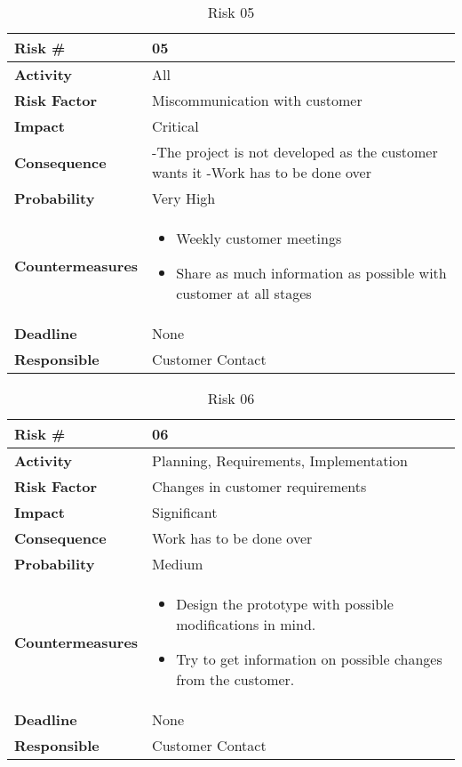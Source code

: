\medskip

\begin{table}
\begin{tabularx}{\textwidth}{ | l | X | }
\hline
\textbf{Risk \#} & 05 \\ \hline
\textbf{Activity} & All \\ \hline
\textbf{Risk Factor} & Miscommunication with customer \\ \hline
\textbf{Impact} & Critical \\ \hline

\textbf{Consequence} & -The project is not developed as the customer wants it
-Work has to be done over \\ \hline
\textbf{Probability} & Very High \\ \hline
\textbf{Countermeasures} & \begin{itemize}
  \item Weekly customer meetings
  \item Share as much information as possible with customer at all stages
\end{itemize}  \\ \hline
\textbf{Deadline} &  None \\ \hline
\textbf{Responsible} & Customer Contact \\ \hline
\end{tabularx}
\caption{Risk 05}
\end{table}

\medskip

\begin{table}
\begin{tabularx}{\textwidth}{ | l | X | }
\hline
\textbf{Risk \#} & 06 \\ \hline
\textbf{Activity} & Planning, Requirements, Implementation \\ \hline
\textbf{Risk Factor} & Changes in customer requirements \\ \hline
\textbf{Impact} & Significant \\ \hline
\textbf{Consequence} & Work has to be done over  \\ \hline
\textbf{Probability} & Medium \\ \hline
\textbf{Countermeasures} & \begin{itemize}
  \item Design the prototype with possible modifications in mind.
  \item Try to get information on possible changes from the customer.
\end{itemize}  \\ \hline
\textbf{Deadline} &  None \\ \hline
\textbf{Responsible} & Customer Contact \\ \hline
\end{tabularx}
\caption{Risk 06}
\end{table}

